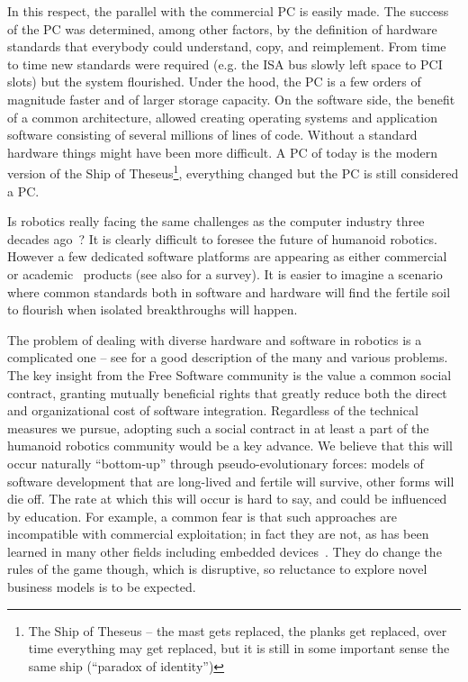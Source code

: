 In this respect, the parallel with the commercial PC is easily made. 
The success of the PC was determined, among other factors, by the definition 
of hardware standards that everybody could understand, copy, and reimplement. 
From time to time new standards were required (e.g. the ISA bus slowly left
space to PCI slots) but the system flourished. Under the hood, the PC is a 
few orders of magnitude faster and of larger
storage capacity. On the software side, the benefit of a common architecture, 
allowed creating operating systems and application software consisting of 
several millions of lines of code. Without a standard hardware things
might have been more difficult.
%
A PC of today is the modern 
version of the Ship of Theseus\footnote{The Ship of 
Theseus -- the mast gets replaced,
the planks get replaced, over time everything may get replaced,
but it is still in some important sense the same ship (``paradox
of identity'')}, everything changed but the PC is still considered
a PC. 
%

Is robotics really facing the same challenges as the computer industry
three decades ago~\cite{gates2007robot}? 
%
It is clearly difficult to foresee the future of humanoid robotics. However
a few dedicated software platforms are appearing as either 
commercial~\cite{microsoft}
or academic~\cite{vaughan2006reusable} products (see also 
\cite{kramer2007development} for a survey). It is
easier %
to imagine a scenario where common standards both in 
software and hardware will find the fertile soil to flourish when 
isolated breakthroughs will happen.




The problem of dealing with diverse hardware and software 
in robotics is a complicated one -- see \cite{nesnas2006claraty} 
for a good description of the many and various problems.
%
The key insight from the Free Software community is the value
a common social contract, granting mutually beneficial rights
that greatly reduce both the direct and organizational cost
of software integration.  Regardless of the technical
measures we pursue, adopting such a social contract
in at least a part of the humanoid robotics community would
be a key advance.
%
We believe that this will occur naturally ``bottom-up''
through pseudo-evolutionary forces: models of software 
development that are long-lived and fertile will survive,
other forms will die off.
%
The rate at which this will occur is hard to say,
and could be influenced by education.
%
For example, a common fear is that such approaches are incompatible
with commercial exploitation; in fact they are not, as has been
learned in many other fields including embedded
devices~\cite{henkel2006selective}.  They do change the rules of the
game though, which is disruptive, so reluctance to explore novel
business models is to be expected.

